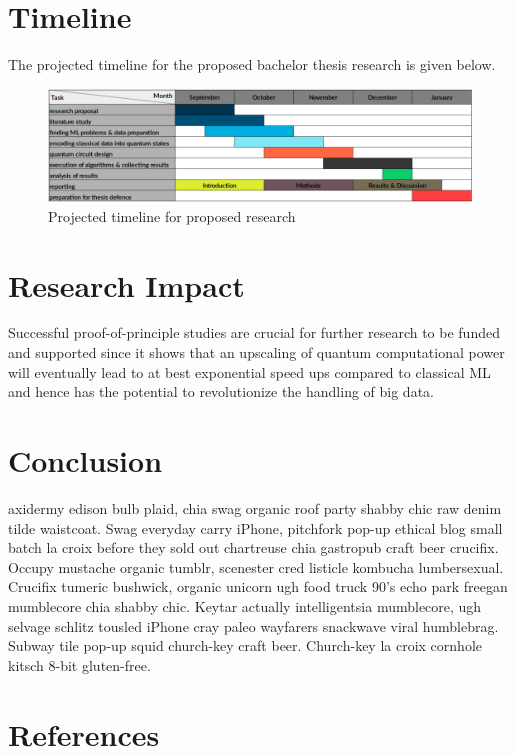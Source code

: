\documentclass[a4paper]{article}
\newcommand*{\0}{$\ket{0}$}
\newcommand*{\1}{$\ket{1}$}
\begin{document}
{\section{Timeline}
\label{sec:timeline}

The projected timeline for the proposed bachelor thesis research is given below.

\begin{figure}[!ht]
\centering
\includegraphics[scale=0.385]{ready_timeline.png}
\caption{Projected timeline for proposed research}
\end{figure}

\section{Research Impact}
\label{sec:research impact}
Successful proof-of-principle studies are crucial for further research to be funded and supported since it shows that an upscaling of quantum computational power will eventually lead to at best exponential speed ups compared to classical ML and hence has the potential to revolutionize the handling of big data.

\section{Conclusion}
\label{sec:conclusion}
axidermy edison bulb plaid, chia swag organic roof party shabby chic raw denim tilde waistcoat. Swag everyday carry iPhone, pitchfork pop-up ethical blog small batch la croix before they sold out chartreuse chia gastropub craft beer crucifix. Occupy mustache organic tumblr, scenester cred listicle kombucha lumbersexual. Crucifix tumeric bushwick, organic unicorn ugh food truck 90's echo park freegan mumblecore chia shabby chic. Keytar actually intelligentsia mumblecore, ugh selvage schlitz tousled iPhone cray paleo wayfarers snackwave viral humblebrag. Subway tile pop-up squid church-key craft beer. Church-key la croix cornhole kitsch 8-bit gluten-free.

\newpage
\section{References}
\begingroup
\renewcommand{\section}[2]{}%


\endgroup


\end{document}

